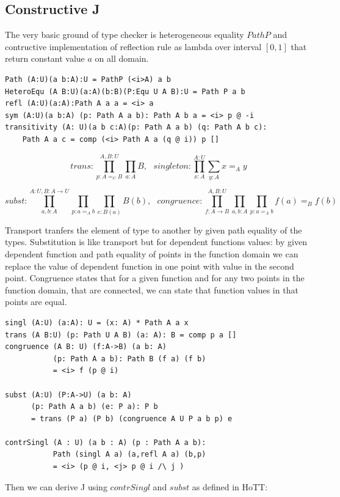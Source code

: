 \documentclass{article}
\begin{document}
\subsection{Constructive J}

The very basic ground of type checker is heterogeneous equality $PathP$ and contructive
implementation of reflection rule as lambda over interval $[0,1]$ that
return constant value $a$ on all domain.

\begin{lstlisting}[mathescape=true]
Path (A:U)(a b:A):U = PathP (<i>A) a b
HeteroEqu (A B:U)(a:A)(b:B)(P:Equ U A B):U = Path P a b
refl (A:U)(a:A):Path A a a = <i> a
sym (A:U)(a b:A) (p: Path A a b): Path A b a = <i> p @ -i
transitivity (A: U)(a b c:A)(p: Path A a b) (q: Path A b c):
    Path A a c = comp (<i> Path A a (q @ i)) p []
\end{lstlisting}

$$trans : \prod_{p:A=_U B}^{A,B:U} \prod_{a:A} B,\ \ \ singleton : \prod_{x:A}^{A:U} \sum_{y:A} x =_A y $$

$$subst : \prod_{a,b:A}^{A:U,B:A\rightarrow U} \prod_{p: a =_A b} \prod_{e:B(a)} B(b), \ \ \ 
  congruence : \prod_{f:A\rightarrow B}^{A,B:U} \prod_{a,b:A} \prod_{p:a =_A b} f(a) =_B f(b) $$

Transport tranfers the element of type to another by given path equality of the types.
Substitution is like transport but for dependent functions values: by given dependent function
and path equality of points in the function domain we can replace the value of dependent function
in one point with value in the second point. Congruence states that for a given function
and for any two points in the function domain, that are connected, we can state that function
values in that points are equal.

\begin{lstlisting}[mathescape=true]
singl (A:U) (a:A): U = (x: A) * Path A a x
trans (A B:U) (p: Path U A B) (a: A): B = comp p a []
congruence (A B: U) (f:A->B) (a b: A)
           (p: Path A a b): Path B (f a) (f b)
           = <i> f (p @ i)

subst (A:U) (P:A->U) (a b: A)
      (p: Path A a b) (e: P a): P b
      = trans (P a) (P b) (congruence A U P a b p) e

contrSingl (A : U) (a b : A) (p : Path A a b):
           Path (singl A a) (a,refl A a) (b,p)
           = <i> (p @ i, <j> p @ i /\ j )
\end{lstlisting}

Then we can derive J using $contrSingl$ and $subst$ as defined in HoTT\cite{HoTT}:
\end{document}
